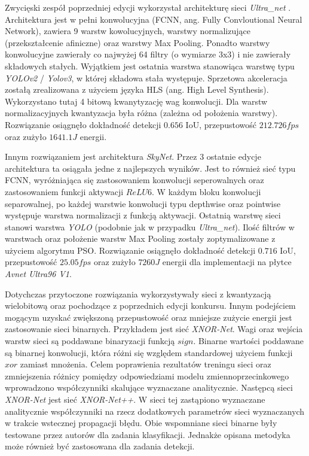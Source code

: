 Zwycięski zespół poprzedniej edycji wykorzystał architekturę sieci \emph{Ultra\_net} \cite{ultra_net}. 
Architektura jest w pełni konwolucyjna (FCNN, ang. Fully Convloutional Neural Network), zawiera 9 warstw kowolucyjnych, warstwy normalizujące (przekształcenie afiniczne) oraz warstwy Max Pooling. 
Ponadto warstwy konwolucyjne zawierały co najwyżej 64 filtry (o wymiarze 3x3) i nie zawierały składowych stałych. Wyjątkiem jest ostatnia warstwa  stanowiąca warstwę typu \emph{YOLOv2}\cite{yolov2} / \emph{Yolov3}\cite{yolov3}, w której składowa stała występuje.
Sprzetowa akceleracja zostałą zrealizowana z użyciem języka HLS (ang. High Level Synthesis). 
Wykorzystano tutaj 4 bitową kwanytyzację wag konwolucji. 
Dla warstw normalizacyjnych kwantyzacja była różna (zależna od położenia warstwy).
Rozwiązanie osiągnęło dokładność detekcji $0.656$ IoU, przepustowość $212.726 fps$ oraz zużyło $1641.1 J$ energii. 

Innym rozwiązaniem jest architektura \emph{SkyNet}\cite{skynet}. 
Przez 3 ostatnie edycje architektura ta osiągała jedne z najlepszych wyników.
Jest to również sieć typu FCNN, wyróżniająca się zastosowaniem konwolucji seperowalnych oraz zastosowaniem funkcji aktywacji $ReLU6$.
W każdym bloku konwolucji separowalnej, po każdej warstwie konwolucji typu depthwise oraz pointwise  występuje warstwa normalizacji z funkcją aktywacji.
Ostatnią warstwę sieci stanowi warstwa \emph{YOLO} (podobnie jak w przypadku \emph{Ultra\_net}).
Ilość filtrów w warstwach oraz położenie warstw Max Pooling zostały zoptymalizowane z użyciem algorytmu PSO.
Rozwiązanie osiągnęło dokładność detekcji $0.716$ IoU, przepustowość $25.05 fps$ oraz zużyło $7260 J$ energii dla implementacji na płytce \emph{Avnet Ultra96 V1}. 

Dotychczas przytoczone rozwiązania wykorzystywały sieci z kwantyzacją wielobitową oraz pochodzące z poprzednich edycji konkursu. Innym podejściem mogącym uzyskać zwiększoną przepustowość oraz mniejsze zużycie energii jest zastosowanie sieci binarnych. Przykładem jest sieć \emph{XNOR-Net}\cite{xnor_net}. Wagi oraz wejścia warstw sieci są poddawane binaryzacji funkcją $sign$. 
Binarne wartości poddawane są binarnej konwolucji, która różni się względem standardowej użyciem funkcji $xor$ zamiast mnożenia. 
Celem poprawienia rezultatów treningu sieci oraz zmniejszenia różnicy pomiędzy odpowiedziami modelu zmiennoprzecinkowego wprowadzono współczynniki skalujące wyznaczane analitycznie. 
Następcą sieci \emph{XNOR-Net} jest sieć \emph{XNOR-Net++}\cite{xnor_net++}. W sieci tej zastąpiono wyznaczane analitycznie współczynniki na rzecz dodatkowych parametrów sieci wyznaczanych w trakcie wstecznej propagacji błędu.
Obie wspomniane sieci binarne były testowane przez autorów dla zadania klasyfikacji. 
Jednakże opisana metodyka może również być zastosowana dla zadania detekcji.


